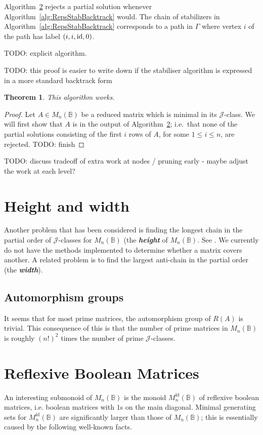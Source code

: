 \documentclass[11pt]{article}
\newtheorem{thm}{Theorem}[section]
\newcommand{\defn}[1]{\textbf{\textit{#1}}}
\numberwithin{equation}{section}
\newcommand{\id}{\mbox{\rm id}}
\newcommand{\B}{\mathbb{B}}
\newcommand{\Bn}{M_n(\B)}
\newcommand{\Refn}{M_n^{\text{id}}(\B)}
\newcommand{\J}{\mathscr{J}}
\begin{document}
Algorithm~\ref{} rejects a partial solution whenever
Algorithm~\ref{alg:RepsStabBacktrack} would. The chain of stabilizers in
Algorithm~\ref{alg:RepsStabBacktrack} corresponds to a path in $\Gamma$ where
vertex $i$ of the path has label $(i, i, \id, 0)$.

TODO: explicit algorithm.

TODO: this proof is easier to write down if the stabiliser algorithm is
expressed in a more standard backtrack form
\begin{thm}
  This algorithm works.
\end{thm}
\begin{proof}
  Let $A \in \Bn$ be a reduced matrix which is minimal in its $\J$-class. We
  will first show that $A$ is in the output of Algorithm~\ref{}; i.e.\ that none
  of the partial solutions consisting of the first $i$ rows of $A$, for some $1
  \leq i \leq n$, are rejected. TODO: finish 
\end{proof}


TODO: discuss tradeoff of extra work at nodes / pruning early - maybe adjust the
work at each level?


\section{Height and width}
Another problem that has been considered is finding the longest chain in the
partial order of $\J$-classes for $\Bn$ (the \defn{height} of $\Bn$. 
See \cite{Breen2001}. We currently do not have the methods implemented to determine whether a matrix covers another.
A related problem is to find the largest anti-chain in the partial order
(the \defn{width}).



\subsection*{Automorphism groups}
It seems that for most prime matrices, the automorphism group of $R(A)$ is trivial. This consequence of this is that the number of prime matrices in $\Bn$ is roughly $(n!)^2$ times the number of prime $\J$-classes.

\section{Reflexive Boolean Matrices}
An interesting submonoid of $\Bn$ is the monoid $\Refn$ of reflexive boolean
matrices, i.e. boolean matrices with $1$s on the main diagonal. Minimal
generating sets for $\Refn$ are significantly larger than those of $\Bn$; this
is essentially caused by the following well-known facts.
\end{document}
